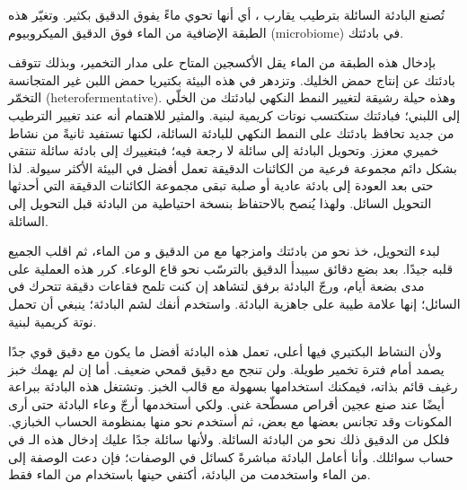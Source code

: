 \begin{flowchart}[!htb]
\centering

\caption[التحويل إلى بادئة سائلة]{عملية تحويل بادئتك العادية أو الصلبة إلى بادئة سائلة. تستغرق العملية بأكملها نحو \num{3} أيام. وكلما أطلت إبقاء بادئتك عند مستوى الترطيب المقترح، تأقلمت الكائنات الدقيقة أكثر. يُنصح بالاحتفاظ بنسخة احتياطية من بادئتك الأصلية، لأن البيئة السائلة سترشّح الكائنات الدقيقة اللاهوائية. وهذا يعزز البكتيريا المنتجة لحمض اللبن بدلًا من حمض الخليك، فتُستشعر الحمضية الناتجة أخف. وحين تبدأ ببادئة سائلة ستُضفي بادئتك الصلبة نوتات لبنية خفيفة، بينما إن بدأت هذه العملية ببادئة عادية فستحمل البادئة الصلبة الناتجة نوتات لبنية وخلّية معًا.}\label{flc:liquid-starter-conversion}
\end{flowchart}

تُصنع البادئة السائلة بترطيب يقارب ، أي أنها تحوي ماءً يفوق الدقيق بكثير. وتغيّر هذه الطبقة الإضافية من الماء فوق الدقيق الميكروبيوم \textenglish{(microbiome)} في بادئتك.

بإدخال هذه الطبقة من الماء يقل الأكسجين المتاح على مدار التخمير، وبذلك تتوقف بادئتك عن إنتاج حمض الخليك. وتزدهر في هذه البيئة بكتيريا حمض اللبن غير المتجانسة التخمّر \textenglish{(heterofermentative)}. وهذه حيلة رشيقة لتغيير النمط النكهي لبادئتك من الخلّي إلى اللبني؛ فبادئتك ستكتسب نوتات كريمية لبنية. والمثير للاهتمام أنه عند تغيير الترطيب من جديد تحافظ بادئتك على النمط النكهي للبادئة السائلة، لكنها تستفيد ثانيةً من نشاط خميري معزز. وتحويل البادئة إلى سائلة لا رجعة فيه؛ فبتغييرك إلى بادئة سائلة تنتقي بشكل دائم مجموعة فرعية من الكائنات الدقيقة تعمل أفضل في البيئة الأكثر سيولة. لذا حتى بعد العودة إلى بادئة عادية أو صلبة تبقى مجموعة الكائنات الدقيقة التي أحدثها التحويل السائل. ولهذا يُنصح بالاحتفاظ بنسخة احتياطية من البادئة قبل التحويل إلى السائلة.

لبدء التحويل، خذ نحو  من بادئتك وامزجها مع  من الدقيق و من الماء، ثم اقلب الجميع قلبه جيدًا. بعد بضع دقائق سيبدأ الدقيق بالترسّب نحو قاع الوعاء. كرر هذه العملية على مدى بضعة أيام، ورجّ البادئة برفق لتشاهد إن كنت تلمح فقاعات  دقيقة تتحرك في السائل؛ إنها علامة طيبة على جاهزية البادئة. واستخدم أنفك لشم البادئة؛ ينبغي أن تحمل نوتة كريمية لبنية.

ولأن النشاط البكتيري فيها أعلى، تعمل هذه البادئة أفضل ما يكون مع دقيق قوي جدًا يصمد أمام فترة تخمير طويلة. ولن تنجح مع دقيق قمحي ضعيف. أما إن لم يهمك خبز رغيف قائم بذاته، فيمكنك استخدامها بسهولة مع قالب الخبز. وتشتغل هذه البادئة ببراعة أيضًا عند صنع عجين أقراص مسطّحة غني. ولكي أستخدمها أرجّ وعاء البادئة حتى أرى المكونات وقد تجانس بعضها مع بعض، ثم أستخدم نحو  منها بمنظومة الحساب الخبازي. فلكل  من الدقيق ذلك نحو  من البادئة السائلة. ولأنها سائلة جدًا عليك إدخال هذه الـ في حساب سوائلك. وأنا أعامل البادئة مباشرةً كسائل في الوصفات؛ فإن دعت الوصفة إلى  من الماء واستخدمت  من البادئة، أكتفي حينها باستخدام  من الماء فقط.


